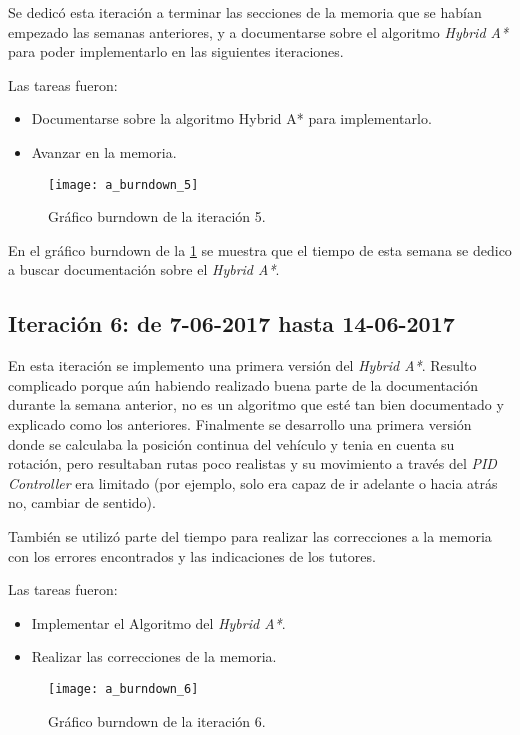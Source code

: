 Se dedicó esta iteración a terminar las secciones de la memoria que se habían empezado las semanas anteriores, y a documentarse sobre el algoritmo \textit{Hybrid A*} para poder implementarlo en las siguientes iteraciones.

Las tareas fueron:
\begin{itemize}
\item Documentarse sobre la algoritmo Hybrid A* para implementarlo.
\item Avanzar en la memoria.
\end{itemize}

\begin{figure}[htpb]
    \centering
    \texttt{[image: a\_burndown\_5]}
    \caption[Gráfico burndown de la iteración 5]{Gráfico burndown de la iteración 5.}
    \label{fig:burndown5}
\end{figure}

En el gráfico burndown de la \ref{fig:burndown5} se muestra que el tiempo de esta semana se dedico a buscar documentación sobre el \textit{Hybrid A*}.

\newpage
\subsection{Iteración 6: de 7-06-2017 hasta 14-06-2017}
En esta iteración se implemento una primera versión del \textit{Hybrid A*}. Resulto complicado porque aún habiendo realizado buena parte de la documentación durante la semana anterior, no es un algoritmo que esté tan bien documentado y explicado como los anteriores. Finalmente se desarrollo una primera versión donde se calculaba la posición continua del vehículo y tenia en cuenta su rotación, pero resultaban rutas poco realistas y su movimiento a través del \textit{PID Controller} era limitado (por ejemplo, solo era capaz de ir adelante o hacia atrás no, cambiar de sentido).

También se utilizó parte del tiempo para realizar las correcciones a la memoria con los errores encontrados y las indicaciones de los tutores.

Las tareas fueron:
\begin{itemize}
\item Implementar el Algoritmo del \textit{Hybrid A*}.
\item Realizar las correcciones de la memoria.
\end{itemize}

\begin{figure}[htpb]
    \centering
    \texttt{[image: a\_burndown\_6]}
    \caption[Gráfico burndown de la iteración 6]{Gráfico burndown de la iteración 6.}
    \label{fig:burndown6}
\end{figure}

